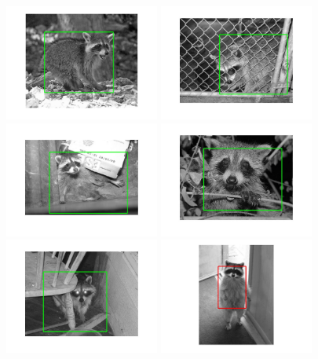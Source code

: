 \documentclass[10pt,twocolumn,letterpaper]{article}
\begin{document}
\begin{figure}
\begin{center}
\end{center}
\begin{center}
    \includegraphics[width=2in]{loc_r_1.jpg}
    \includegraphics[width=2in]{loc_r_2.jpg}
    \includegraphics[width=2in]{loc_r_3.jpg}
    \includegraphics[width=2in]{loc_r_7.jpg}
    \includegraphics[width=2in]{loc_r_8.jpg}
    \includegraphics[width=2in]{loc_r_6.jpg}

\end{center}
\end{figure}
\end{document}
